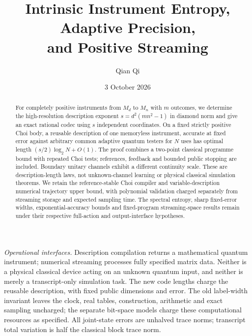 \documentclass[11pt]{amsart}
\title[Instrument entropy and positive streaming]{Intrinsic Instrument Entropy, Adaptive Precision,\\and Positive Streaming}
\author{Qian Qi}
\date{3 October 2026}
\numberwithin{equation}{section}
\theoremstyle{definition}\newtheorem{definition}[theorem]{Definition}
\theoremstyle{remark}\newtheorem{remark}[theorem]{Remark}
\begin{document}
\raggedbottom
\begin{abstract}
For completely positive instruments from $M_d$ to $M_n$ with $m$
outcomes, we determine the high-resolution description exponent
$s=d^2(mn^2-1)$ in diamond norm and give an exact rational codec using
$s$ independent coordinates. On a fixed strictly positive Choi body,
a reusable description of one memoryless instrument, accurate at fixed
error against arbitrary common
adaptive quantum testers for $N$ uses has optimal length
$(s/2)\log_2N+O(1)$. The proof combines a two-point classical programme
bound with repeated Choi tests; references, feedback and bounded public
stopping are included. Boundary unitary channels exhibit a different
continuity scale. These are description-length laws, not unknown-channel
learning or physical classical simulation theorems. We retain the
reference-stable Choi compiler and variable-description numerical
trajectory upper bound, with polynomial validation charged separately
from streaming storage and expected sampling time. The spectral entropy,
sharp fixed-error widths, exponential-accuracy bounds and fixed-program
streaming-space results remain under their respective full-action and
output-interface hypotheses.
\end{abstract}
\maketitle
\noindent\textit{Operational interfaces.}
Description compilation returns a mathematical quantum instrument;
numerical streaming processes fully specified matrix data. Neither is a
physical classical device acting on an unknown quantum input, and
neither is merely a transcript-only simulation task. The new code lengths
charge the reusable description, with fixed public dimensions and error.
The old label-width invariant leaves the clock, real tables, construction,
arithmetic and exact sampling uncharged; the separate bit-space models
charge these computational resources as specified. All joint-state errors
are unhalved trace norms; transcript total variation is half the classical
block trace norm.




























\end{document}
